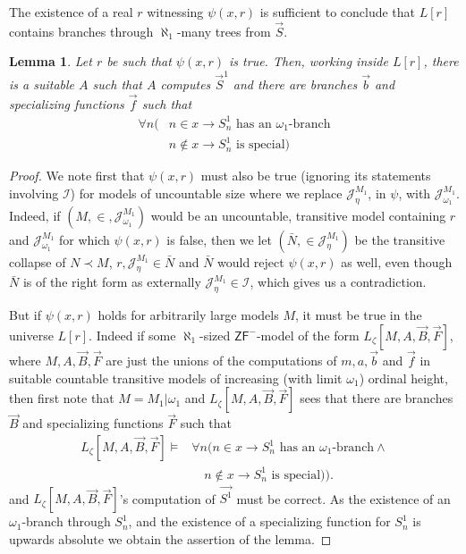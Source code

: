 \documentclass[a4paper,11pt]{article}
\newtheorem{lemma}[theorem]{Lemma}
\newcommand{\ZFP}{\mathsf{ZF}^-}
\begin{document}
The existence of a real $r$ witnessing $\psi(x,r)$ is sufficient to conclude that $L[r]$ contains branches through $\aleph_1$-many trees from $\vec{S}$.
\begin{lemma}\label{definable well-order of reals determines real world}
Let $r$ be such that $\psi(x,r)$ is true.
Then, working inside $L[r]$, there is a suitable $A$ such that $A$ computes $\vec{S}^1$ and there are branches $\vec{b}$ and specializing functions $\vec{f}$ such that
\begin{align*}
\forall n (&n \in x \rightarrow S^1_{n} \text{ has an $\omega_1$-branch} \\& 
n \notin x \rightarrow S^1_n \text{ is special} )
\end{align*}
\end{lemma}
\begin{proof}
We note first that $\psi(x,r)$ must also be true (ignoring its statements involving $\mathcal{I}$) for models of uncountable size where we replace $\mathcal{J}^{M_1}_{\eta}$, in $\psi$, with $\mathcal{J}^{M_1}_{\omega_1}$. Indeed, if $(M, \in , \mathcal{J}^{M_1}_{\omega_1} )$ would be an uncountable, transitive model containing $r$ and $\mathcal{J}^{M_1}_{\omega_1}$ for which $\psi(x,r)$ is false, then we let $(\bar{N}, \in \mathcal{J}^{M_1}_{\eta} )$ be the transitive collapse of $N \prec M$, $r, \mathcal{J}^{M_1}_{\eta} \in \bar{N}$ and $\bar{N}$ would reject $\psi(x,r)$ as well, even though $\bar{N}$ is of the right form as externally $\mathcal{J}^{M_1}_{\eta} \in \mathcal{I}$, which gives us a contradiction.

But if $\psi(x,r)$ holds for arbitrarily large models $M$, it must be true in the universe $L[r]$. Indeed if some $\aleph_1$-sized  $\ZFP$-model of the form $L_{\zeta} [M,A, \vec{B}, \vec{F}]$, where $M,A, \vec{B}, \vec{F}$ are just the unions of the computations of $m,a, \vec{b}$ and $\vec{f}$ in suitable countable transitive models of increasing (with limit $\omega_1$) ordinal height, then first note that $M=M_1 | \omega_1$ and $L_{\zeta} [M,A, \vec{B}, \vec{F}]$ sees that there are branches $\vec{B}$ and specializing functions $\vec{F}$ such that 
\begin{align*}
 L_{\zeta} [M,A, \vec{B}, \vec{F}] \models  &\forall  n (n  \in x  \rightarrow S^1_{n}  \text{ has an $\omega_1$-branch}  \land \\&
		 \quad  	n \notin x \rightarrow S^1_{n}  \text{ is special})) .
\end{align*}
and $L_{\zeta} [M,A, \vec{B}, \vec{F}] $'s computation of $\vec{S^1}$ must be correct. As the existence of an $\omega_1$-branch through $S^1_{n}$, and the existence of a specializing function for $S^1_n$ is upwards absolute we obtain the assertion of the lemma.
\end{proof}
\end{document}
